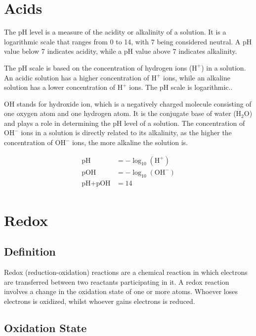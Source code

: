 \documentclass[a4paper]{article}
\begin{document}
\pagebreak

\section{Acids}

The pH level is a measure of the acidity or alkalinity of a solution. It is a logarithmic scale that ranges from 0 to 14, with 7 being considered neutral. A pH value below 7 indicates acidity, while a pH value above 7 indicates alkalinity.

The pH scale is based on the concentration of hydrogen ions (\(\text{H}^+\)) in a solution. An acidic solution has a higher concentration of \(\text{H}^+\) ions, while an alkaline solution has a lower concentration of \(\text{H}^+\) ions. The pH scale is logarithmic..

OH stands for hydroxide ion, which is a negatively charged molecule consisting of one oxygen atom and one hydrogen atom. It is the conjugate base of water (\(\text{H}_2\text{O}\)) and plays a role in determining the pH level of a solution. The concentration of \(\text{OH}^-\) ions in a solution is directly related to its alkalinity, as the higher the concentration of \(\text{OH}^-\) ions, the more alkaline the solution is.

\begin{align*}
    \text{pH} &= - \log_{10}(\text{H}^+) \\
    \text{pOH} &= - \log_{10}(\text{OH}^-) \\
    \text{pH} + \text{pOH} &= 14 \\
\end{align*}

\pagebreak

\section{Redox}

\subsection{Definition}

Redox (reduction-oxidation) reactions are a chemical reaction in which electrons are transferred between two reactants participating in it.
A redox reaction involves a change in the oxidation state of one or more atoms.
Whoever loses electrons is oxidized, whilst whoever gains electrons is reduced.

\subsection{Oxidation State}
\end{document}
